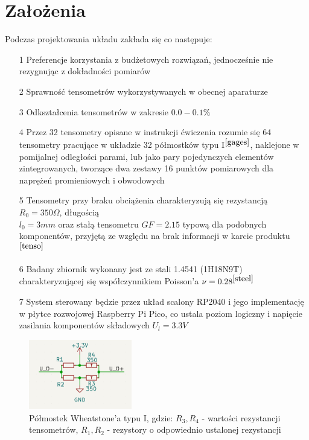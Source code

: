 \documentclass[12pt]{article}
\begin{document}
\section{Założenia}
	Podczas projektowania układu zakłada się co następuje:
	\begin{enumerate}
		\item[1] Preferencje korzystania z budżetowych rozwiązań, jednocześnie nie rezygnując z dokładności pomiarów
		\item[2] Sprawność tensometrów wykorzystywanych w obecnej aparaturze
		\item[3] Odkształcenia tensometrów w zakresie $0.0-0.1 \% $
		\item[4] Przez 32 tensometry opisane w instrukcji ćwiczenia rozumie się 64 tensometry pracujące w układzie 32 półmostków typu I$^{\cite{gages}}$, naklejone w pomijalnej odległości parami, lub jako pary pojedynczych elementów zintegrowanych, tworzące dwa zestawy 16 punktów pomiarowych dla naprężeń promieniowych i obwodowych
		\item[5] Tensometry przy braku obciążenia charakteryzują się rezystancją $R_0=350\Omega$, długością\\ $l_0=3mm$ oraz stałą tensometru $GF=2.15$ typową dla podobnych komponentów, przyjętą  ze względu na brak informacji w karcie produktu$^{\cite{tenso}}$
		\item[6] Badany zbiornik wykonany jest ze stali 1.4541 (1H18N9T) charakteryzującej się współczynnikiem Poisson'a $\nu = 0.28^{\cite{steel}}$
		\item[7] System sterowany będzie przez układ scalony RP2040 i jego implementację w płytce rozwojowej Raspberry Pi Pico, co ustala poziom logiczny i napięcie zasilania komponentów składowych $U_l = 3.3V$
	\end{enumerate}
	
	\begin{figure}[H]
		\centering
		\includegraphics[width=0.4\textwidth, center]{half_bridge}
		\caption{Półmostek Wheatstone'a typu I, gdzie: $R_3, R_4$ - wartości rezystancji tensometrów, $R_1, R_2$ - rezystory o odpowiednio ustalonej rezystancji}
		\label{rys:bridge}
	\end{figure}
	
\end{document}
